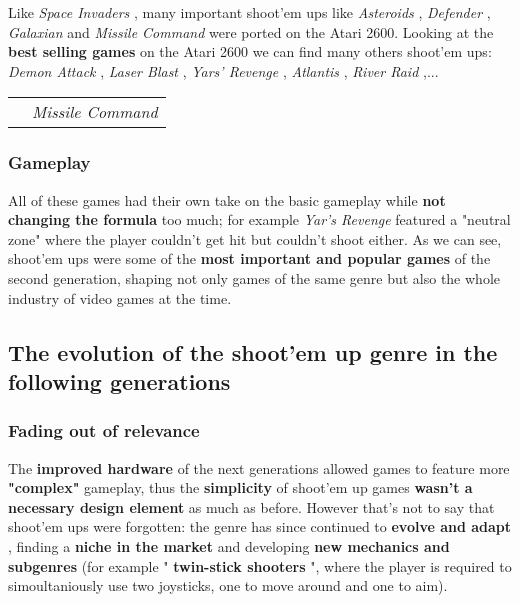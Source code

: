\documentclass[a4paper,10pt]{book}
\begin{document}
 
          Like  \textit{Space Invaders }, many important shoot'em ups like  \textit{Asteroids },  \textit{Defender },  \textit{Galaxian } and  \textit{Missile Command } were ported on the Atari 2600.
          Looking at the  \textbf{best selling games }  on the Atari 2600 we can find many others shoot'em ups:  \textit{Demon Attack },  \textit{Laser Blast },  \textit{Yars' Revenge },  \textit{Atlantis },  \textit{River Raid },...  
 
 
 \begin{longtable}{p{1mm}|l|}\hline
 
 & 
 \\\hline
 
 & \textit{Missile Command }
 \\\hline
 \end{longtable}
 
 \subsubsection{Gameplay }
 
 
          All of these games had their own take on the basic gameplay while  \textbf{not changing the formula }  too much; for example  \textit{Yar's Revenge } featured a "neutral zone" where the player couldn't get hit but couldn't shoot either.
          As we can see, shoot'em ups were some of the  \textbf{most important and popular games }  of the second generation, shaping not only games of the same genre but also the whole industry of video games at the time.
         
 
 \subsection{The evolution of the shoot'em up genre in the following generations }
 
 \subsubsection{Fading out of relevance }
 
 
          The  \textbf{improved hardware }  of the next generations allowed games to feature more  \textbf{"complex" }  gameplay, thus the  \textbf{simplicity }  of shoot'em up games  \textbf{wasn't a necessary design element }  as much as before.
          However that's not to say that shoot'em ups were forgotten: the genre has since continued to  \textbf{evolve and adapt } , finding a  \textbf{niche in the market }  and developing  \textbf{new mechanics and subgenres } 
          (for example " \textbf{twin-stick shooters } ", where the player is required to simoultaniously use two joysticks, one to move around and one to aim).  
 
\end{document}
